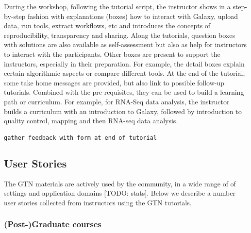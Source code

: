 \documentclass[10pt,letterpaper]{article}
\begin{document}
During the workshop, following the tutorial script, the instructor shows in a step-by-step fashion with explanations (boxes) how to interact with Galaxy, upload data, run tools, extract workflows, etc and introduces the concepts of reproducibility, transparency and sharing.
Along the tutorials, question boxes with solutions are also available as self-assessment but also as help for instructors to interact with the participants. Other boxes are present to support the instructors, especially in their preparation.
For example, the detail boxes explain certain algorithmic aspects or compare different tools.
At the end of the tutorial, some take home messages are provided, but also link to possible follow-up tutorials.
Combined with the pre-requisites, they can be used to build a learning path or curriculum.
For example, for RNA-Seq data analysis, the instructor builds a curriculum with an introduction to Galaxy, followed by introduction to quality control, mapping and then RNA-seq data analysis.

\verb+gather feedback with form at end of tutorial+

\subsection*{User Stories}

The GTN materials are actively used by the community, in a wide range of of settings and application domains [TODO: stats].
Below we describe a number user stories collected from instructors using the GTN tutorials.

\subsubsection*{(Post-)Graduate courses}
\end{document}
